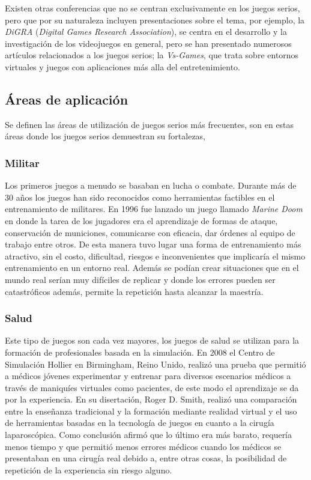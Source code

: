 Existen otras conferencias que no se centran exclusivamente en los juegos
serios, pero que por su naturaleza incluyen presentaciones sobre el tema, por
ejemplo, la \emph{DiGRA} (\textit{Digital Games Research Association}), se
centra en el desarrollo y la investigación de los videojuegos en general, pero
se han presentado numerosos artículos relacionados a  los juegos serios; la
\emph{Vs-Games}, que trata sobre entornos virtuales y juegos con  aplicaciones
más alla del entretenimiento.

\subsection{Áreas de aplicación}
\label{sec:areas_aplicacion}

Se definen las áreas de utilización de juegos serios más frecuentes, son en 
estas áreas donde los juegos serios demuestran su fortalezas,

\subsubsection{Militar}

Los primeros juegos a menudo se basaban en lucha o combate. Durante más de 30
años los juegos han sido reconocidos como herramientas factibles en el
entrenamiento de militares. En 1996 fue lanzado un juego llamado \emph{Marine
    Doom} en donde la tarea de los jugadores era el aprendizaje de formas de
ataque, conservación de municiones, comunicarse con eficacia, dar órdenes al
equipo de trabajo entre otros. De esta manera tuvo lugar una forma de
entrenamiento más atractivo, sin el costo, dificultad, riesgos e inconvenientes
que implicaría el mismo entrenamiento en un entorno real. Además se podían crear
situaciones que en el mundo real serían muy difíciles de replicar y donde los
errores pueden ser catastróficos además, permite la repetición hasta alcanzar la
maestría\cite{education:games}.

\subsubsection{Salud}

Este tipo de juegos son cada vez mayores, los juegos de salud se utilizan para
la formación de profesionales basada en la simulación. En 2008 el Centro de
Simulación Hollier en Birmingham, Reino Unido, realizó una prueba que permitió
a médicos jóvenes experimentar y entrenar para diversos escenarios médicos a
través de maniquíes virtuales como pacientes, de este modo el aprendizaje se da
por la experiencia. En su disertación, Roger D. Smith, realizó una comparación
entre la enseñanza tradicional y la formación mediante realidad virtual y el
uso de herramientas basadas en la tecnología de juegos en cuanto a la cirugía
laparoscópica. Como conclusión afirmó que lo último era más barato, requería
menos tiempo y que permitió menos errores médicos cuando los médicos se
presentaban en una cirugía real debido a, entre otras cosas, la posibilidad de
repetición de la experiencia sin riesgo alguno\cite{education:games}. 

